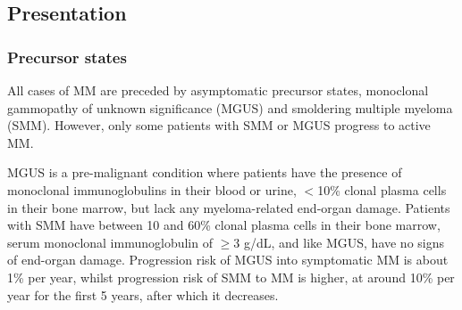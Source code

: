 \subsection{Presentation}
\subsubsection{Precursor states}
All cases of MM are preceded by asymptomatic precursor states, monoclonal gammopathy of unknown significance (MGUS) and smoldering multiple myeloma (SMM).
However, only some patients with SMM or MGUS progress to active MM.

MGUS is a pre-malignant condition where patients have the presence of monoclonal immunoglobulins in their blood or urine, $<$10\% clonal plasma cells in their bone marrow, but lack any myeloma-related end-organ damage\cite{van2018mgus}.
Patients with SMM have between 10 and 60\% clonal plasma cells in their bone marrow, serum monoclonal immunoglobulin of $\ge$3 g/dL, and like MGUS, have no signs of end-organ damage\cite{rajkumar2015smoldering}.
Progression risk of MGUS into symptomatic MM is about 1\% per year, whilst progression risk of SMM to MM is higher, at around 10\% per year for the first 5 years, after which it decreases\cite{korde2011monoclonal, kyle2007clinical}.
%

